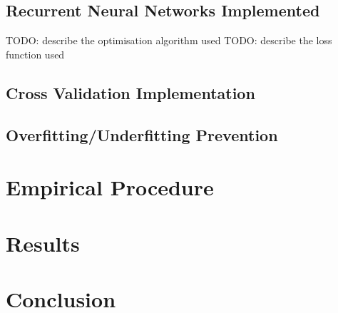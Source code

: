 \documentclass[conference, 10pt]{IEEEtran}
\begin{document}
\subsection{Recurrent Neural Networks Implemented}
TODO: describe the optimisation algorithm used
TODO: describe the loss function used
\subsection{Cross Validation Implementation}

\subsection{Overfitting/Underfitting Prevention}


\section{Empirical Procedure}


\section{Results}

\section{Conclusion}



\nocite{myrepo}

\end{document}

